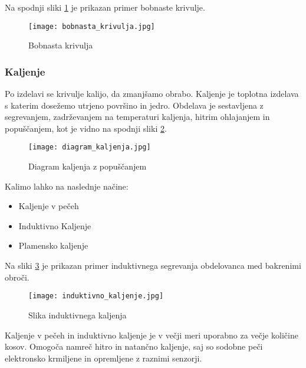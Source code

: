 Na spodnji sliki \ref{bobnaste_krivulje} je prikazan primer 
bobnaste krivulje.

\begin{figure}[H]
    \begin{center}
        \texttt{[image: bobnasta\_krivulja.jpg]}
        \caption{Bobnasta krivulja
        \cite{lasten}}   
        \label{bobnaste_krivulje}
    \end{center}
\end{figure}

\newpage
\subsubsection{Kaljenje}
Po izdelavi se krivulje kalijo, da zmanjšamo obrabo. Kaljenje 
je toplotna izdelava s katerim dosežemo utrjeno površino in jedro. 
Obdelava je sestavljena z segrevanjem, zadrževanjem na temperaturi 
kaljenja, hitrim ohlajanjem in popuščanjem, kot je vidno na spodnji
sliki \ref{diagram_kaljenja}.

\begin{figure}[H]
    \begin{center}
        \texttt{[image: diagram\_kaljenja.jpg]}
        \caption{Diagram kaljenja z popuščanjem
        \cite{diagram_kaljenja}}
        \label{diagram_kaljenja}
    \end{center}
\end{figure}

Kalimo lahko na naslednje načine:
\begin{itemize}
    \item Kaljenje v pečeh
    \item Induktivno Kaljenje
    \item Plamensko kaljenje
\end{itemize}

Na sliki \ref{induktivno_kaljenje} je prikazan primer induktivnega 
segrevanja obdelovanca med bakrenimi obroči.

\begin{figure}[H]
    \begin{center}
        \texttt{[image: induktivno\_kaljenje.jpg]}
        \caption{Slika induktivnega kaljenja
        \cite{lasten}}
        \label{induktivno_kaljenje}
    \end{center}
\end{figure}

Kaljenje v pečeh in induktivno kaljenje je v večji meri uporabno 
za večje količine kosov. Omogoča namreč hitro in natančno kaljenje,
saj so sodobne peči elektronsko krmiljene in opremljene z raznimi senzorji.

